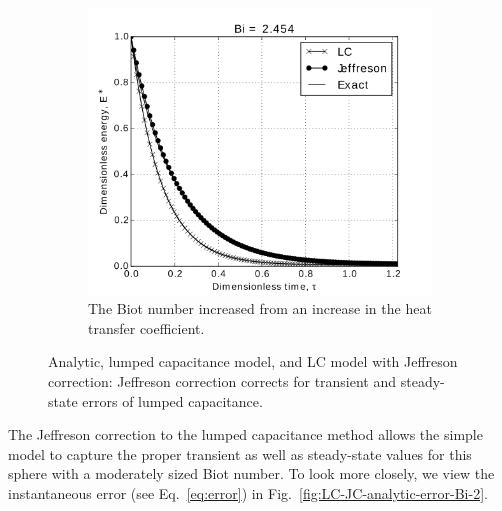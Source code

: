 \begin{figure}
        \begin{subfigure}[b]{0.5\textwidth}
                \includegraphics[width=\textwidth]{chapters/figures/LC-JC-analytic-sphere-in-fluid-Bi-2b}
                \caption{The Biot number increased from  an increase in the heat transfer coefficient.}
				\label{fig:LC-JC-analytic-sphere-in-fluid-Bi-2b}
        \end{subfigure}
        \caption[Jeffreson correction for moderate Biot number based on conductivity]{Analytic, lumped capacitance model, and LC model with Jeffreson correction: Jeffreson correction corrects for transient and steady-state errors of lumped capacitance.}\label{fig:LC-JC-analytic-sphere-in-fluid-Bi-2}
\end{figure}

The Jeffreson correction to the lumped capacitance method allows the simple model to capture the proper transient as well as steady-state values for this sphere with a moderately sized Biot number. To look more closely, we view the instantaneous error (see Eq.~\ref{eq:error}) in Fig.~\ref{fig:LC-JC-analytic-error-Bi-2}.

